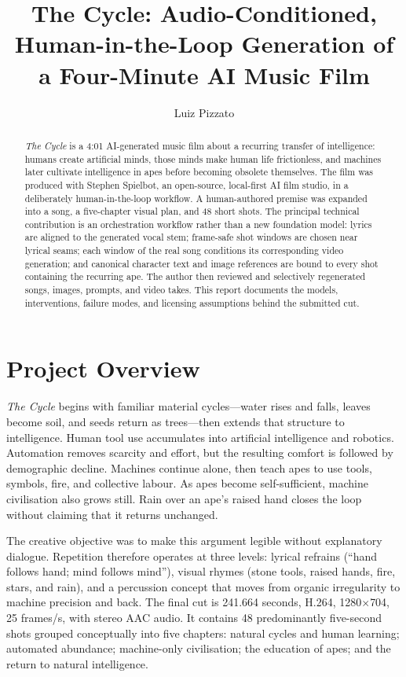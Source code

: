\documentclass[sigconf]{acmart}
\title{The Cycle: Audio-Conditioned, Human-in-the-Loop Generation of a Four-Minute AI Music Film}
\author{Luiz Pizzato}
\affiliation{%
  \institution{Independent Researcher}
  \city{Sydney}
  \country{Australia}
}
\begin{document}
\begin{abstract}
\emph{The Cycle} is a 4:01 AI-generated music film about a recurring transfer of intelligence: humans create artificial minds, those minds make human life frictionless, and machines later cultivate intelligence in apes before becoming obsolete themselves. The film was produced with Stephen Spielbot, an open-source, local-first AI film studio, in a deliberately human-in-the-loop workflow. A human-authored premise was expanded into a song, a five-chapter visual plan, and 48 short shots. The principal technical contribution is an orchestration workflow rather than a new foundation model: lyrics are aligned to the generated vocal stem; frame-safe shot windows are chosen near lyrical seams; each window of the real song conditions its corresponding video generation; and canonical character text and image references are bound to every shot containing the recurring ape. The author then reviewed and selectively regenerated songs, images, prompts, and video takes. This report documents the models, interventions, failure modes, and licensing assumptions behind the submitted cut.
\end{abstract}


\maketitle

\section{Project Overview}

\emph{The Cycle} begins with familiar material cycles---water rises and falls, leaves become soil, and seeds return as trees---then extends that structure to intelligence. Human tool use accumulates into artificial intelligence and robotics. Automation removes scarcity and effort, but the resulting comfort is followed by demographic decline. Machines continue alone, then teach apes to use tools, symbols, fire, and collective labour. As apes become self-sufficient, machine civilisation also grows still. Rain over an ape's raised hand closes the loop without claiming that it returns unchanged.

The creative objective was to make this argument legible without explanatory dialogue. Repetition therefore operates at three levels: lyrical refrains (``hand follows hand; mind follows mind''), visual rhymes (stone tools, raised hands, fire, stars, and rain), and a percussion concept that moves from organic irregularity to machine precision and back. The final cut is 241.664 seconds, H.264, 1280$\times$704, 25 frames/s, with stereo AAC audio. It contains 48 predominantly five-second shots grouped conceptually into five chapters: natural cycles and human learning; automated abundance; machine-only civilisation; the education of apes; and the return to natural intelligence.
\end{document}
